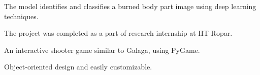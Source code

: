\documentclass[]{deedy-resume-openfont}
\begin{document}
\begin{minipage}[t]{0.66\textwidth}
\begin{tightemize}
\item The model identifies and classifies a burned body part image using deep learning techniques.
\item The project was completed as a part of research internship at IIT Ropar.
\end{tightemize}
\sectionsep

\begin{tightemize}
\item An interactive shooter game similar to Galaga, using PyGame.
\item Object-oriented design and easily customizable.
\end{tightemize}
\sectionsep





\end{minipage}
\end{document}
